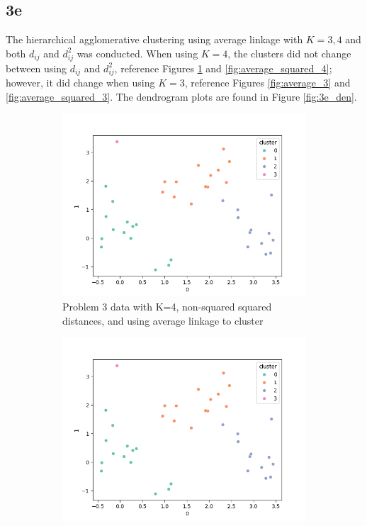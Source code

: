 \documentclass[12pt]{article}
\begin{document}
\clearpage

\subsection*{3e}

The hierarchical agglomerative clustering using average linkage with $K=3,4$ and both $d_{ij}$ and $d_{ij}^2$ was conducted. When using $K=4$, the clusters did not change between using $d_{ij}$ and $d_{ij}^2$, reference Figures \ref{fig:average_4} and \ref{fig:average_squared_4}; however, it did change when using $K=3$, reference Figures \ref{fig:average_3} and \ref{fig:average_squared_3}. The dendrogram plots are found in Figure \ref{fig:3e_den}.

\begin{figure}[ht!]
    \begin{subfigure}{0.5\textwidth}
        \centering
        \includegraphics[width=\linewidth]{../plots/average_linkage_4.png}
        \caption{Problem 3 data with K=4, non-squared squared distances, and using average linkage to cluster}
        \label{fig:average_4}
    \end{subfigure}
    \begin{subfigure}{0.5\textwidth}
        \centering
        \includegraphics[width=\linewidth]{../plots/average_squared_4.png}

\end{subfigure}
\end{figure}
\end{document}
